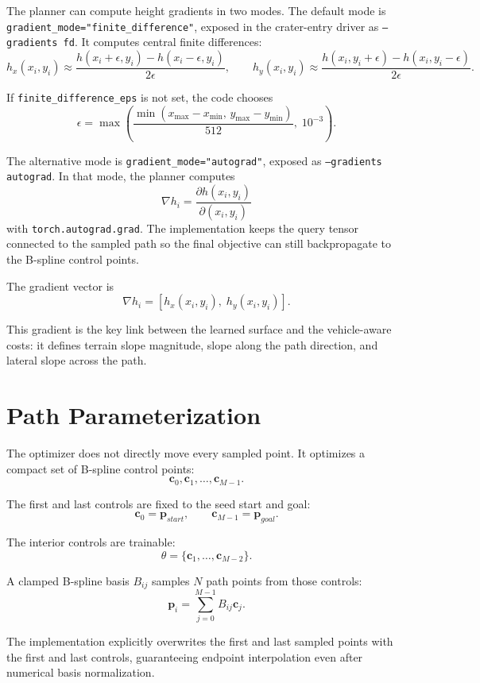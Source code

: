 \documentclass[11pt]{article}
\begin{document}
The planner can compute height gradients in two modes. The default mode is
\texttt{gradient\_mode="finite\_difference"}, exposed in the crater-entry driver as
\texttt{--gradients fd}. It computes central finite differences:
\[
  h_x(x_i,y_i) \approx
  \frac{h(x_i+\epsilon,y_i)-h(x_i-\epsilon,y_i)}{2\epsilon},
  \qquad
  h_y(x_i,y_i) \approx
  \frac{h(x_i,y_i+\epsilon)-h(x_i,y_i-\epsilon)}{2\epsilon}.
\]

If \texttt{finite\_difference\_eps} is not set, the code chooses
\[
  \epsilon = \max \left( \frac{\min(x_{\max}-x_{\min},\,y_{\max}-y_{\min})}{512},\;10^{-3} \right).
\]

The alternative mode is \texttt{gradient\_mode="autograd"}, exposed as
\texttt{--gradients autograd}. In that mode, the planner computes
\[
  \nabla h_i =
  \frac{\partial h(x_i,y_i)}{\partial (x_i,y_i)}
\]
with \texttt{torch.autograd.grad}. The implementation keeps the query tensor
connected to the sampled path so the final objective can still backpropagate to
the B-spline control points.

The gradient vector is
\[
  \nabla h_i = [h_x(x_i,y_i),\;h_y(x_i,y_i)].
\]

This gradient is the key link between the learned surface and the vehicle-aware costs: it defines terrain slope magnitude, slope along the path direction, and lateral slope across the path.

\section{Path Parameterization}

The optimizer does not directly move every sampled point. It optimizes a compact set of B-spline control points:
\[
  \mathbf{c}_0,\mathbf{c}_1,\ldots,\mathbf{c}_{M-1}.
\]

The first and last controls are fixed to the seed start and goal:
\[
  \mathbf{c}_0 = \mathbf{p}_{start}, \qquad
  \mathbf{c}_{M-1} = \mathbf{p}_{goal}.
\]

The interior controls are trainable:
\[
  \theta = \{\mathbf{c}_1,\ldots,\mathbf{c}_{M-2}\}.
\]

A clamped B-spline basis \(B_{ij}\) samples \(N\) path points from those controls:
\[
  \mathbf{p}_i = \sum_{j=0}^{M-1} B_{ij}\mathbf{c}_j.
\]

The implementation explicitly overwrites the first and last sampled points with the first and last controls, guaranteeing endpoint interpolation even after numerical basis normalization.
\end{document}
